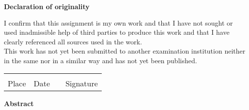 \documentclass[
	pdftex,
	oneside,
	12pt,
	parskip=half,
	headheight = 12pt,
	headsepline,
	footheight = 16pt,
	footsepline,	
	DIV=calc,
	BCOR=8mm,
	headinclude=false,
	footinclude=false,
	listof=totoc,
	toc=bibliography
]{scrreprt}
\begin{document}
    \vspace*{5cm} 
    \begin{center}
        \textbf{Declaration of originality}
    \end{center}

    I confirm that this assignment is my own work and that I have not sought or used inadmissible help of third parties to produce this work and that I have clearly referenced all sources used in the work.\\[5mm]
    This work has not yet been submitted to another examination institution neither in the same nor in a similar way and has not yet been published.\\[1cm]

    \begin{tabular}{ p{3cm}p{3cm}p{1cm}p{5cm} }
        \hrulefill & \hrulefill & & \hrulefill\\
        Place & Date & & Signature\\
    \end{tabular}

	\newpage
	\pagestyle{plain}

    \vspace*{5cm} 
    \begin{center}
        \textbf{Abstract}
    \end{center}


    \newpage

    \tableofcontents

    \newpage

    

    \newpage

    
    

	\clearpage
	
\end{document}

